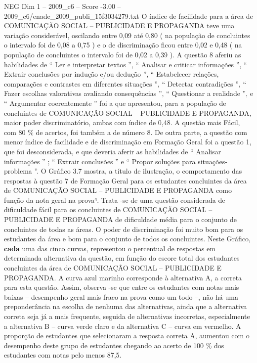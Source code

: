 \begin{textsample}{NEG Dim 1 – 2009\_c6 – Score -3.00 – 2009\_c6/enade\_2009\_publi\_15f3034279.txt}
O índice de facilidade para a área de COMUNICAÇÃO SOCIAL – PUBLICIDADE E PROPAGANDA teve uma variação considerável, oscilando entre 0,09 até 0,80 ( na população de concluintes o intervalo foi de 0,08 a 0,75 ) e o de discriminação ficou entre 0,02 e 0,48 ( na população de concluintes o intervalo foi de 0,02 a 0,39 ).
A questão 8 aferiu as habilidades de “ Ler e interpretar textos ”, “ Analisar e criticar informações ”, “ Extrair conclusões por indução e/ou dedução ”, “ Estabelecer relações, comparações e contrastes em diferentes situações ”, “ Detectar contradições ”, “ Fazer escolhas valorativas avaliando consequências ”, “ Questionar a realidade ”, e “ Argumentar coerentemente ” foi a que apresentou, para a população de concluintes de COMUNICAÇÃO SOCIAL – PUBLICIDADE E PROPAGANDA, maior poder discriminatório, ambas com índice de 0,48.
A questão mais Fácil, com 80 \% de acertos, foi também a de número 8.
De outra parte, a questão com menor índice de facilidade e de discriminação em Formação Geral foi a questão 1, que foi desconsiderada, e que deveria aferir as habilidades de “ Analisar informações ” ; “ Extrair conclusões ” e “ Propor soluções para situações-problema ”.
O Gráfico 3.7 mostra, a título de ilustração, o comportamento das respostas à questão 7 de Formação Geral para os estudantes concluintes da área de COMUNICAÇÃO SOCIAL – PUBLICIDADE E PROPAGANDA como função da nota geral na prova⁴.
Trata -se de uma questão considerada de dificuldade fácil para os concluintes de COMUNICAÇÃO SOCIAL – PUBLICIDADE E PROPAGANDA de dificuldade média para o conjunto de concluintes de todas as áreas.
O poder de discriminação foi muito bom para os estudantes da área e bom para o conjunto de todos os concluintes.
Neste Gráfico, \textbf{cada} uma das cinco curvas, representou o percentual de respostas em determinada alternativa da questão, em função do escore total dos estudantes concluintes da área de COMUNICAÇÃO SOCIAL – PUBLICIDADE E PROPAGANDA.
A curva azul marinho corresponde à alternativa A, a correta para esta questão.
Assim, observa -se que entre os estudantes com notas mais baixas – desempenho geral mais fraco na prova como um todo –, não há uma preponderância na escolha de nenhuma das alternativas, ainda que a alternativa correta seja já a mais frequente, seguida de alternativas incorretas, especialmente a alternativa B – curva verde claro e da alternativa C – curva em vermelho.
A proporção de estudantes que selecionaram a resposta correta A, aumentou com o desempenho deste grupo de estudantes chegando ao acerto de 100 \% dos estudantes com notas pelo menos 87,5.

\end{textsample}
